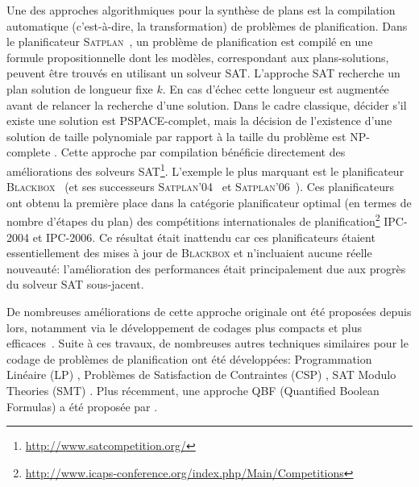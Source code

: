 Une des approches algorithmiques pour la synthèse de plans est la compilation automatique (c'est-à-dire, la transformation) de problèmes de planification. Dans le planificateur \textsc{Satplan}~\cite{KS92}, un problème de planification est compilé en une formule propositionnelle dont les modèles, correspondant aux plans-solutions, peuvent être trouvés en utilisant un solveur SAT.
L'approche SAT recherche un plan solution de longueur fixe $k$. En cas d'échec cette longueur est augmentée avant de relancer la recherche d'une solution. Dans le cadre classique, décider s'il existe une solution est PSPACE-complet, mais la décision de l'existence d'une solution de taille polynomiale par rapport à la taille du problème est NP-complete \cite{DBLP:journals/ai/Bylander94}.
Cette approche par compilation bénéficie directement des améliorations des solveurs SAT\footnote{\url{http://www.satcompetition.org/}}. L'exemple le plus marquant est le planificateur \textsc{Blackbox}~\cite{KS98a,KS99} (et ses successeurs \textsc{Satplan}'04~\cite{KAU04} et \textsc{Satplan}'06~\cite{KSH06}). Ces planificateurs ont obtenu la première place dans la catégorie planificateur optimal (en termes de nombre d'étapes du plan) des compétitions internationales de planification\footnote{\url{http://www.icaps-conference.org/index.php/Main/Competitions}} IPC-2004 et IPC-2006. Ce résultat était inattendu car ces planificateurs étaient essentiellement des mises à jour de \textsc{Blackbox} et n'incluaient aucune réelle nouveauté: l'amélioration des performances était principalement due aux progrès du solveur SAT sous-jacent.



De nombreuses améliorations de cette approche originale ont été proposées depuis lors, notamment via le développement de codages plus compacts et plus efficaces~\cite{KS96,EMW97,MK98a,MK99,RIN03,RHN04,RHN06,DBLP:conf/aips/2008}. %
Suite à ces travaux, de nombreuses autres techniques similaires pour le codage de problèmes de planification ont été développées: Programmation Linéaire (LP) \cite{DBLP:conf/ijcai/WolfmanW99}, Problèmes de Satisfaction de Contraintes (CSP) \cite{DBLP:journals/ai/DoK01}, SAT Modulo Theories (SMT) \cite{DBLP:journals/ai/ShinD05,DBLP:conf/ictai/MarisR08,DBLP:conf/aaai/Rintanen15}. Plus récemment, une approche QBF (Quantified Boolean Formulas) a été proposée par \cite{DBLP:conf/aaai/Rintanen07,DBLP:conf/ecai/CashmoreFG12}.
 \cite{GasquetLMRV18}

